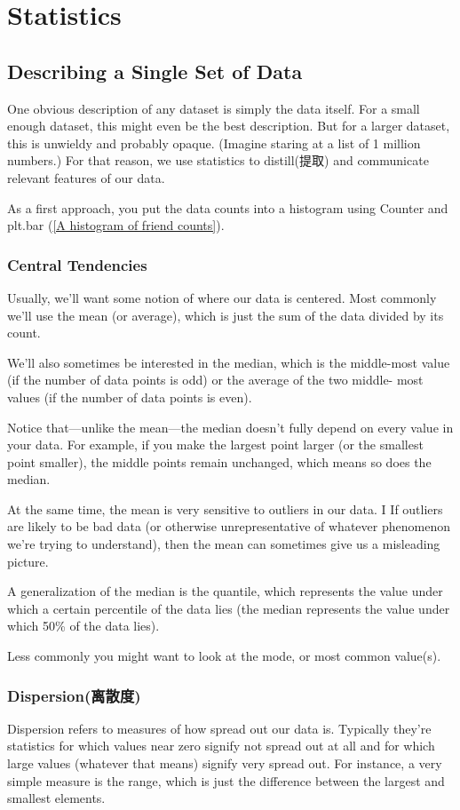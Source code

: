 \chapter{Statistics}
\section{Describing a Single Set of Data}
One obvious description of any dataset is simply the data itself. For a small enough dataset, this might even be the best description. But for
a larger dataset, this is unwieldy and probably opaque. (Imagine staring at a
list of 1 million numbers.) For that reason, we use statistics to distill(提取) and
communicate relevant features of our data.

As a first approach, you put the data counts into a histogram using
Counter and plt.bar (\autoref{A histogram of friend counts}).


\subsection{Central Tendencies}
Usually, we'll want some notion of where our data is centered. Most
commonly we'll use the mean (or average), which is just the sum of the
data divided by its count.

We'll also sometimes be interested in the median, which is the middle-most
value (if the number of data points is odd) or the average of the two middle-
most values (if the number of data points is even).

Notice that—unlike the mean—the median doesn't fully depend on every
value in your data. For example, if you make the largest point larger (or the
smallest point smaller), the middle points remain unchanged, which means
so does the median.

At the same time, the mean is very sensitive to outliers in our data. I If outliers are likely to be
bad data (or otherwise unrepresentative of whatever phenomenon we're
trying to understand), then the mean can sometimes give us a misleading
picture.

A generalization of the median is the quantile, which represents the value
under which a certain percentile of the data lies (the median represents the
value under which 50\% of the data lies).

Less commonly you might want to look at the mode, or most common
value(s).

\subsection{Dispersion(离散度)}
Dispersion refers to measures of how spread out our data is. Typically
they're statistics for which values near zero signify not spread out at all and
for which large values (whatever that means) signify very spread out. For
instance, a very simple measure is the range, which is just the difference
between the largest and smallest elements.

